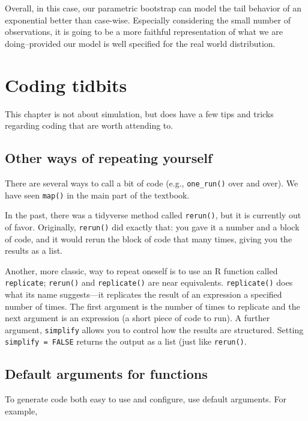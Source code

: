 \documentclass[
]{book}
\begin{document}
Overall, in this case, our parametric bootstrap can model the tail behavior of an exponential better than case-wise.
Especially considering the small number of observations, it is going to be a more faithful representation of what we are doing--provided our model is well specified for the real world distribution.

\appendix


\chapter{Coding tidbits}\label{on-functions}

This chapter is not about simulation, but does have a few tips and tricks regarding coding that are worth attending to.

\section{Other ways of repeating yourself}\label{repeating-oneself}

There are several ways to call a bit of code (e.g., \texttt{one\_run()} over and over).
We have seen \texttt{map()} in the main part of the textbook.

In the past, there was a tidyverse method called \texttt{rerun()}, but it is currently out of favor.
Originally, \texttt{rerun()} did exactly that: you gave it a number and a block of code, and it would rerun the block of code that many times, giving you the results as a list.

Another, more classic, way to repeat oneself is to use an R function called \texttt{replicate}; \texttt{rerun()} and \texttt{replicate()} are near equivalents.
\texttt{replicate()} does what its name suggests---it replicates the result of an expression a specified number of times. The first argument is the number of times to replicate and the next argument is an expression (a short piece of code to run). A further argument, \texttt{simplify} allows you to control how the results are structured. Setting \texttt{simplify\ =\ FALSE} returns the output as a list (just like \texttt{rerun()}.

\section{Default arguments for functions}\label{default-arguments}

To generate code both easy to use and configure, use default arguments.
For example,
\end{document}
